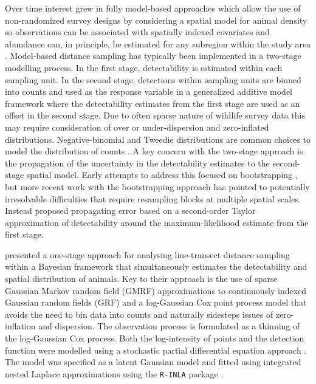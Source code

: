 \documentclass[preprint,12pt]{elsarticle}
\begin{document}
Over time interest grew in fully model-based approaches which allow the use of non-randomized survey designs by considering a spatial model for animal density so observations can be associated with spatially indexed covariates and abundance can, in principle, be estimated for any subregion within the study area \citep{johnson_model-based_2010, miller_spatial_2013, buckland_model-based_2016}.  Model-based distance sampling has typically been implemented in a two-stage modelling process.  In the first stage, detectability is estimated within each sampling unit.  In the second stage, detections within sampling units are binned into counts and used as the response variable in a generalized additive model framework where the detectability estimates from the first stage are used as an offset in the second stage.  Due to often sparse nature of wildlife survey data this may require consideration of over or under-dispersion and zero-inflated distributions.  Negative-binomial and Tweedie distributions are common choices to model the distribution of counts \citep{wood_gam_2017}.
A key concern with the two-stage approach is the propagation of the uncertainty in the detectability estimates to the second-stage spatial model.  Early attempts to address this focused on bootstrapping \citep{lahiri_resampling_2003}, but more recent work with the bootstrapping approach has pointed to potentially irresolvable difficulties that require resampling blocks at multiple spatial scales. Instead \cite{bravington_reliable_2018-1} proposed propagating error based on a second-order Taylor approximation of detectability around the maximum-likelihood estimate from the first stage.

\citet{yuan_point_2017} presented a one-stage approach for analysing line-transect distance sampling within a Bayesian framework that simultaneously estimates the detectability and spatial distribution of animals.  Key to their approach is the use of sparse Gaussian Markov random field (GMRF) approximations to continuously indexed Gaussian random fields (GRF) and a log-Gaussian Cox point process model that avoids the need to bin data into counts and naturally sidesteps issues of zero-inflation and dispersion.  The observation process is formulated as a thinning of the log-Gaussian Cox process.  Both the log-intensity of points and the detection function were modelled using a stochastic partial differential equation approach \citep{lindgren_explicit_2011}.  The model was specified as a latent Gaussian model and fitted using integrated nested Laplace approximations using the \texttt{R-INLA} package \citep{rue_approximate_2009}.
\end{document}
